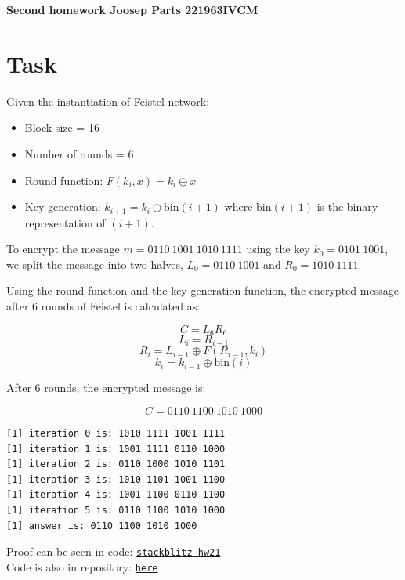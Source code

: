 \documentclass{article}
\begin{document}
\begin{tcolorbox}[colframe=ttblue, colback=ttblue!10]
\begin{center}
\begin{large}
\textbf{Second homework Joosep Parts 221963IVCM}
\end{large}
\end{center}
\end{tcolorbox}

\section{Task}%
Given the instantiation of Feistel network:
\begin{itemize}
  \item Block size = 16
  \item Number of rounds = 6
  \item Round function: $F(k_i, x) = k_i \oplus x$
  \item Key generation: $k_{i+1} = k_i \oplus \text{bin}(i+1)$ where $\text{bin}(i+1)$ is the binary representation of $(i + 1)$.
\end{itemize}

To encrypt the message $m = 0110\ 1001\ 1010\ 1111$ using the key $k_0 = 0101\ 1001$, we split the message into two halves, $L_0 = 0110\ 1001$ and $R_0 = 1010\ 1111$.

Using the round function and the key generation function, the encrypted message after 6 rounds of Feistel is calculated as:

\[ C = L_6 R_6 \]
\[ L_i = R_{i-1} \]
\[ R_i = L_{i-1} \oplus F(R_{i-1}, k_i) \]
\[ k_i = k_{i-1} \oplus \text{bin}(i) \]

After 6 rounds, the encrypted message is:

\[ C = 0110\ 1100\ 1010\ 1000 \]

\begin{verbatim}
[1] iteration 0 is: 1010 1111 1001 1111
[1] iteration 1 is: 1001 1111 0110 1000
[1] iteration 2 is: 0110 1000 1010 1101
[1] iteration 3 is: 1010 1101 1001 1100
[1] iteration 4 is: 1001 1100 0110 1100
[1] iteration 5 is: 0110 1100 1010 1000
[1] answer is: 0110 1100 1010 1000
\end{verbatim}

Proof can be seen in code: \href{https://stackblitz.com/edit/js-ekqepc?devtoolsheight=80&file=hw21.js&hideDevTools=false}{\texttt{stackblitz hw21}}\\
Code is also in repository: \href{https://github.com/Nurech/js-ekqepc}{\texttt{here}}
\end{document}
